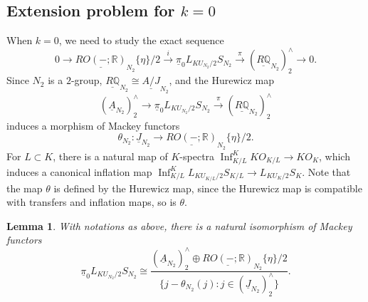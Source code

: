 \documentclass{amsart}
\theoremstyle{plain}
\newtheorem{lemma}[theorem]{Lemma}
\theoremstyle{definition}
\theoremstyle{remark}
\begin{document}
\subsection{Extension problem for $k=0$} When $k=0$, we need to study the exact sequence
\[
0\longrightarrow \underline{RO(-;\mathbb{R})}_{N_2}\{\eta\}/2\xrightarrow{i} \underline{\pi}_0 L_{KU_{N_2}/2}S_{N_2}\xrightarrow{\pi} (\underline{R\mathbb{Q}}_{N_2})_2^\wedge\longrightarrow 0.
\]
Since $N_2$ is a $2$-group, $\underline{R\mathbb{Q}}_{N_2}\cong \underline{A/J}_{N_2}$, and the Hurewicz map $$(\underline{A}_{N_2})_2^\wedge \to \underline{\pi}_0 L_{KU_{N_2}/2}S_{N_2}\xrightarrow{\pi} (\underline{R\mathbb{Q}}_{N_2})_2^\wedge$$ induces a morphism of Mackey functors
\[
  \theta_{N_2}:\underline{J}_{N_2}\longrightarrow \underline{RO(-;\mathbb{R})}_{N_2}\{\eta\}/2.
\]
For $L\subset K$, there is a natural map of $K$-spectra $\operatorname{Inf}_{K/L}^K KO_{K/L}\to KO_K$, which induces a canonical inflation map $\operatorname{Inf}_{K/L}^K L_{KU_{K/L}/2}S_{K/L} \to L_{KU_K/2}S_K$. Note that the map $\theta$ is defined by the Hurewicz map, since the Hurewicz map is compatible with transfers and inflation maps, so is $\theta$.

\begin{lemma}\label{lem:quotient-description}
With notations as above, there is a natural isomorphism of Mackey functors
\[
\underline{\pi}_0 L_{KU_{N_2}/2}S_{N_2}\cong
  \frac{(\underline{A}_{N_2})_2^\wedge \oplus \underline{RO(-;\mathbb{R})}_{N_2}\{\eta\}/2}
       {\{j-\theta_{N_2}(j):j\in (\underline{J}_{N_2})_2^\wedge\}}.
\]
\end{lemma}
\end{document}
